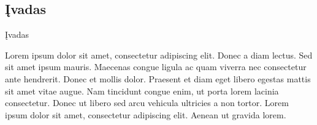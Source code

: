 \begin{center}
      \section*{Įvadas}
\end{center}
{Įvadas}

Lorem ipsum dolor sit amet, consectetur adipiscing elit. Donec a diam lectus. Sed sit amet ipsum mauris. Maecenas congue ligula ac quam viverra nec consectetur ante hendrerit. Donec et mollis dolor. Praesent et diam eget libero egestas mattis sit amet vitae augue. Nam tincidunt congue enim, ut porta lorem lacinia consectetur. Donec ut libero sed arcu vehicula ultricies a non tortor. Lorem ipsum dolor sit amet, consectetur adipiscing elit. Aenean ut gravida lorem.

\newpage